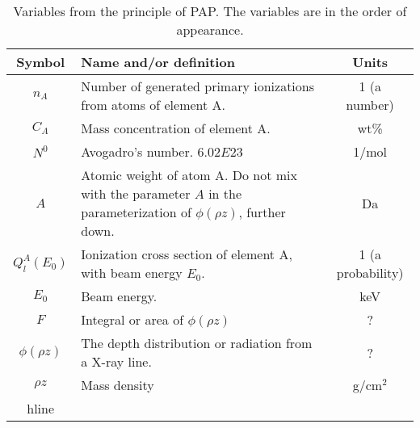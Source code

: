 \begin{table}[phtb]
    \begin{center}
        \caption{
            Variables from the principle of PAP.
            The variables are in the order of appearance.
        }
        \label{tab:quantitative:PAP:variables:principle}
        \begin{tabular}{cp{8cm}c}
            \hline
            \textbf{Symbol} & \textbf{Name and/or definition}                                                                                     & \textbf{Units}    \\
            \hline
            $n_A$           & Number of generated primary ionizations from atoms of element A.                                                    & 1 (a number)      \\
            $C_A$           & Mass concentration of element A.                                                                                    & wt\%              \\
            $N^0$           & Avogadro's number. $6.02E23$                                                                                        & 1/mol             \\
            $A$             & Atomic weight of atom A. Do not mix with the parameter $A$ in the parameterization of $\phi(\rho z)$, further down. & Da                \\
            $Q_l^A(E_0)$    & Ionization cross section of element A, with beam energy $E_0$.                                                      & 1 (a probability) \\
            $E_0$           & Beam energy.                                                                                                        & keV               \\
            $F$             & Integral or area of $\phi(\rho z)$                                                                                  & ?                 \\
            $\phi(\rho z)$  & The depth distribution or radiation from a X-ray line.                                                              & ?                 \\
            $\rho z$        & Mass density                                                                                                        & g/cm$^2$          \\
            hline
        \end{tabular}
    \end{center}
\end{table}
